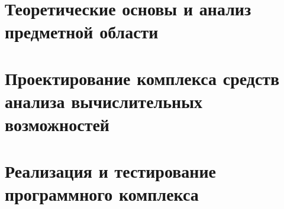 \documentclass[14pt, a4paper]{extarticle}
\begin{document}
\sloppy %



\newpage
\tableofcontents

\newpage

\chapter{Теоретические основы и анализ предметной области}


\chapter{Проектирование комплекса средств анализа вычислительных возможностей}


\chapter{Реализация и тестирование программного комплекса}



\newpage


\newpage
\appendix

\end{document}
